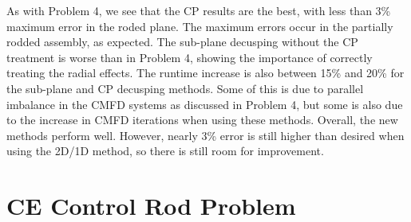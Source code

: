 \begin{table}
\centering
\caption[VERA Problem 5 Decusping Results]{VERA Problem 5 decusping results for the partially rodded plane}\label{t:p5decusp}
\end{table}

As with Problem 4, we see that the CP results are the best, with less than 3\% maximum error in the roded plane.  The maximum errors occur in the partially rodded assembly, as expected.  The sub-plane decusping without the CP treatment is worse than in Problem 4, showing the importance of correctly treating the radial effects.  The runtime increase is also between 15\% and 20\% for the sub-plane and CP decusping methods.  Some of this is due to parallel imbalance in the CMFD systems as discussed in Problem 4, but some is also due to the increase in CMFD iterations when using these methods.  Overall, the new methods perform well.  However, nearly 3\% error is still higher than desired when using the 2D/1D method, so there is still room for improvement.

\section{CE Control Rod Problem}